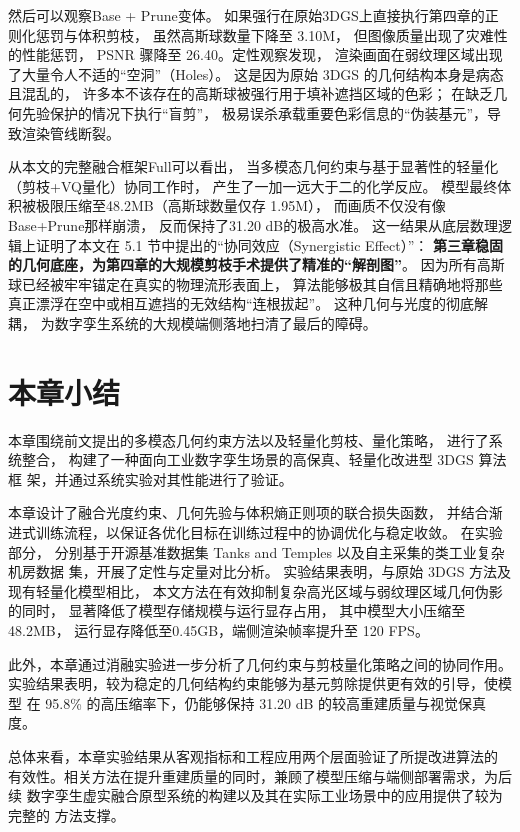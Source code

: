 然后可以观察Base + Prune变体。
如果强行在原始3DGS上直接执行第四章的正则化惩罚与体积剪枝，
虽然高斯球数量下降至 3.10M，
但图像质量出现了灾难性的性能惩罚，
PSNR 骤降至 26.40。定性观察发现，
渲染画面在弱纹理区域出现了大量令人不适的“空洞”（Holes）。
这是因为原始 3DGS 的几何结构本身是病态且混乱的，
许多本不该存在的高斯球被强行用于填补遮挡区域的色彩；
在缺乏几何先验保护的情况下执行“盲剪”，
极易误杀承载重要色彩信息的“伪装基元”，导致渲染管线断裂。

从本文的完整融合框架Full可以看出，
当多模态几何约束与基于显著性的轻量化（剪枝+VQ量化）协同工作时，
产生了一加一远大于二的化学反应。
模型最终体积被极限压缩至48.2MB（高斯球数量仅存 1.95M），
而画质不仅没有像Base+Prune那样崩溃，
反而保持了31.20 dB的极高水准。
这一结果从底层数理逻辑上证明了本文在 5.1 节中提出的“协同效应（Synergistic Effect）”：
\textbf{第三章稳固的几何底座，为第四章的大规模剪枝手术提供了精准的“解剖图”}。
因为所有高斯球已经被牢牢锚定在真实的物理流形表面上，
算法能够极其自信且精确地将那些真正漂浮在空中或相互遮挡的无效结构“连根拔起”。
这种几何与光度的彻底解耦，
为数字孪生系统的大规模端侧落地扫清了最后的障碍。

\section{本章小结}
\label{sec:chap5_summary}

本章围绕前文提出的多模态几何约束方法以及轻量化剪枝、量化策略，
进行了系统整合，
构建了一种面向工业数字孪生场景的高保真、轻量化改进型 3DGS 算法框
架，并通过系统实验对其性能进行了验证。

本章设计了融合光度约束、几何先验与体积熵正则项的联合损失函数，
并结合渐进式训练流程，以保证各优化目标在训练过程中的协调优化与稳定收敛。
在实验部分，
分别基于开源基准数据集 Tanks and Temples 以及自主采集的类工业复杂机房数据
集，开展了定性与定量对比分析。
实验结果表明，与原始 3DGS 方法及现有轻量化模型相比，
本文方法在有效抑制复杂高光区域与弱纹理区域几何伪影的同时，
显著降低了模型存储规模与运行显存占用，
其中模型大小压缩至 48.2MB，
运行显存降低至0.45GB，端侧渲染帧率提升至 120 FPS。

此外，本章通过消融实验进一步分析了几何约束与剪枝量化策略之间的协同作用。
实验结果表明，较为稳定的几何结构约束能够为基元剪除提供更有效的引导，使模型
在 95.8\% 的高压缩率下，仍能够保持 31.20 dB 的较高重建质量与视觉保真度。

总体来看，本章实验结果从客观指标和工程应用两个层面验证了所提改进算法的
有效性。相关方法在提升重建质量的同时，兼顾了模型压缩与端侧部署需求，为后续
数字孪生虚实融合原型系统的构建以及其在实际工业场景中的应用提供了较为完整的
方法支撑。